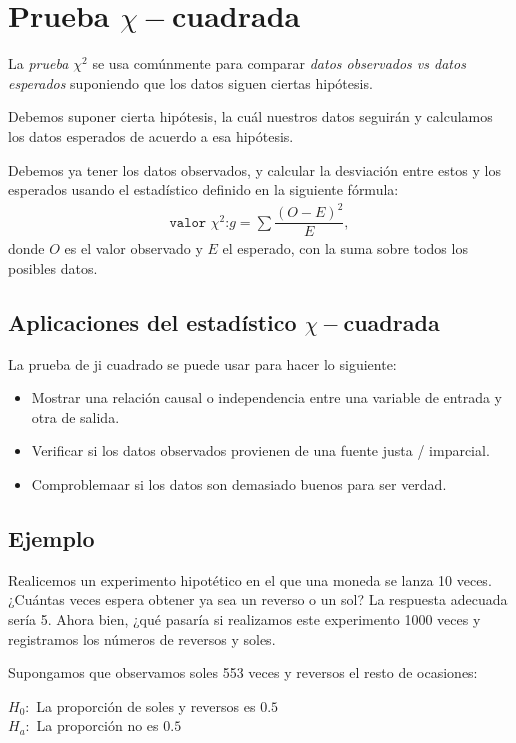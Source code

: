 \section{Prueba $\chi-$cuadrada}

La \emph{prueba $\chi^{2}$} se usa comúnmente para comparar \emph{datos observados vs datos esperados} suponiendo que los datos siguen ciertas hipótesis.


Debemos suponer cierta hipótesis, la cuál nuestros datos seguirán y calculamos los datos esperados de acuerdo a esa hipótesis.


Debemos ya tener los datos observados, y calcular la desviación entre estos y los esperados usando el estadístico definido en la siguiente fórmula:
\begin{align}
	\texttt{valor }\chi^{2}\texttt{:} g= \sum\dfrac{\left( O-E \right)^{2}}{E},
\end{align}
donde $O$ es el valor observado y $E$ el esperado, con la suma sobre todos los posibles datos.

\subsection{Aplicaciones del estadístico $\chi-$cuadrada}
La prueba de ji cuadrado se puede usar para hacer lo siguiente:
\begin{itemize}
	\item Mostrar una relación causal o independencia entre una variable de entrada y otra de salida.  
	\item Verificar si los datos observados provienen de una fuente justa / imparcial. 
	\item Comproblemaar si los datos son demasiado buenos para ser verdad.
\end{itemize}


\subsection{Ejemplo}
Realicemos un experimento hipotético en el que una moneda se lanza 10 veces. ¿Cuántas veces espera obtener ya sea un reverso o un sol?  La respuesta adecuada sería 5.  Ahora bien, ¿qué pasaría si realizamos este experimento 1000 veces y registramos los números de reversos y soles.


Supongamos que observamos soles 553 veces y reversos el resto de ocasiones:
\begin{center}
	$H_{0}:$ La proporción de soles y reversos es $0.5$ \\
	$H_{a}:$ La proporción no es $0.5$
\end{center}



